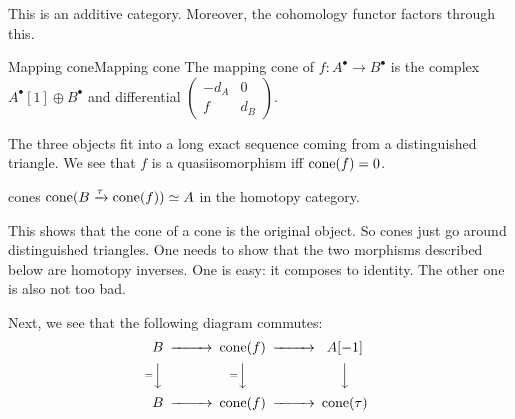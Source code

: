 
This is an additive category. Moreover, the cohomology functor factors through this.

\begin{definition}{Mapping cone}{Mapping cone}
    The mapping cone of $f:A^\bullet\to B^\bullet$ is the complex $A^\bullet[1]\oplus B^\bullet$ and differential $\begin{pmatrix} -d_A & 0 \\ f & d_B \end{pmatrix}$.
\end{definition}

The three objects fit into a long exact sequence coming from a distinguished triangle. We see that $f$ is a quasiisomorphism iff $\operatorname{cone}(f)=0$.

\begin{proposition}{}{cones}
    $\operatorname{cone}(B\xrightarrow\tau\operatorname{cone}(f))\simeq A$ in the homotopy category.
\end{proposition}

This shows that the cone of a cone is the original object. So cones just go around distinguished triangles. One needs to show that the two morphisms described below are homotopy inverses. One is easy: it composes to identity. The other one is also not too bad.


Next, we see that the following diagram commutes:
\begin{equation*}
    \begin{CD}
        B @>>> \cone(f) @>>> A[-1] \\
          @V=VV @V=VV @VVV \\
        B @>>> \cone(f) @>>> \cone(\tau)
    \end{CD}
\end{equation*}

